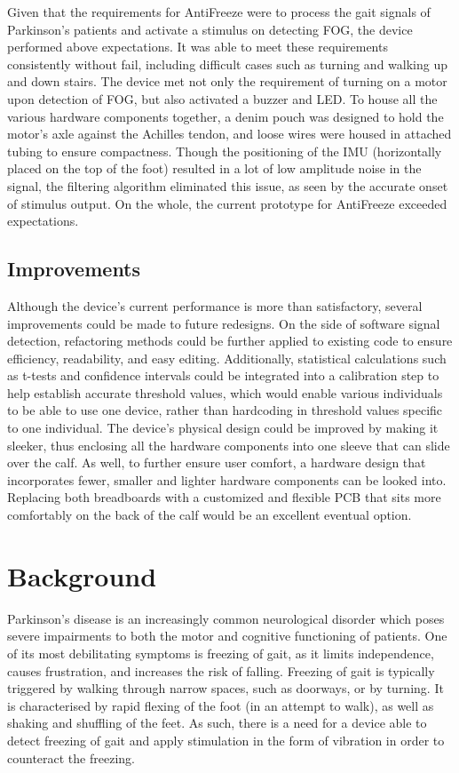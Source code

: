 \documentclass[titlepage]{article}
\begin{document}
\begin{doublespacing}
Given that the requirements for AntiFreeze were to process the gait signals of Parkinson's patients and activate a stimulus on detecting FOG, the device performed above expectations. It was able to meet these requirements consistently without fail, including difficult cases such as turning and walking up and down stairs. The device met not only the requirement of turning on a motor upon detection of FOG, but also activated a buzzer and LED. To house all the various hardware components together, a denim pouch was designed to hold the motor's axle against the Achilles tendon, and loose wires were housed in attached tubing to ensure compactness. Though the positioning of the IMU (horizontally placed on the top of the foot) resulted in a lot of low amplitude noise in the signal, the filtering algorithm eliminated this issue, as seen by the accurate onset of stimulus output. On the whole, the current prototype for AntiFreeze exceeded expectations. 

\subsection{Improvements}

Although the device's current performance is more than satisfactory, several improvements could be made to future redesigns. On the side of software signal detection, refactoring methods could be further applied to existing code to ensure efficiency, readability, and easy editing. Additionally, statistical calculations such as t-tests and confidence intervals could be integrated into a calibration step to help establish accurate threshold values, which would enable various individuals to be able to use one device, rather than hardcoding in threshold values specific to one individual. The device's physical design could be improved by making it sleeker, thus enclosing all the hardware components into one sleeve that can slide over the calf. As well, to further ensure user comfort, a hardware design that incorporates fewer, smaller and lighter hardware components can be looked into. Replacing both breadboards with a customized and flexible PCB that sits more comfortably on the back of the calf would be an excellent eventual option.

\clearpage
\section{Background}

Parkinson's disease is an increasingly common neurological disorder which poses severe impairments to both the motor and cognitive functioning of patients. One of its most debilitating symptoms is freezing of gait, as it limits independence, causes frustration, and increases the risk of falling. Freezing of gait is typically triggered by walking through narrow spaces, such as doorways, or by turning. It is characterised by rapid flexing of the foot (in an attempt to walk), as well as shaking and shuffling of the feet. As such, there is a need for a device able to detect freezing of gait and apply stimulation in the form of vibration in order to counteract the freezing. 


\end{doublespacing}
\end{document}
